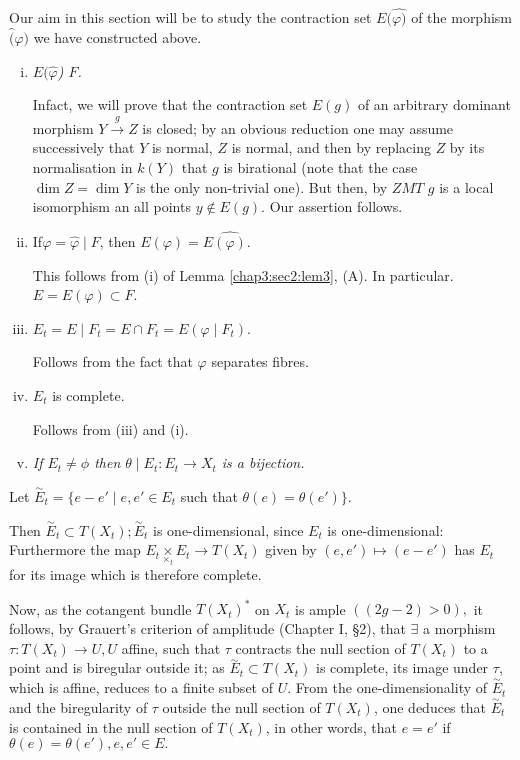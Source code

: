 Our aim in this section will be to study the contraction set $ E
(\hat{\varphi)}$ of the morphism $\hat(\varphi)$ we have
constructed above. 
\begin{enumerate}[(i)]
\item \textit{$E(\hat{\varphi}$) 
  $\hat{F}$.} 

  Infact, we will prove that the contraction set $E(g)$ of an arbitrary
  dominant morphism  $Y \overset{g}\longrightarrow Z$ is closed; by
  an obvious reduction one may assume successively that $Y$ is normal,
  $Z$ is normal, and then by replacing $Z$ by its normalisation in
  $k(Y)$ that $g$ is birational (note that the case $\dim Z= \dim Y$
  is the only non-trivial one). But then, by $ZMT$ $g$ is a local
  isomorphism an all points $ y \notin E(g)$. Our assertion follows. 
\item  If\pageoriginale $\varphi = \hat{\varphi} \mid F$, then
  $E(\varphi) = E\hat{(\varphi)}$. 
  
  This follows from (i) of Lemma \ref{chap3:sec2:lem3}, (A). In particular. $E =
  E(\varphi) \subset F$. 

\item $E_t = E \mid F_t = E \cap F_t = E(\varphi \mid F_t)$.

  Follows from the fact that $\varphi$ separates fibres.

\item $E_t$  is complete.

  Follows from (iii) and (i).
\item  \textit{If $E_t \neq \phi$  then  $\theta \mid E_t: E_t
  \longrightarrow X_t$ is a bijection.} 
\end{enumerate}

Let $ \overset{\sim}{E}_t = \bigg\{e - e' \mid e,e' \in E_t$  such
that $\theta (e) = \theta (e')\bigg\}$. 

Then $ \overset{\sim}{E}_t \subset T(X_t) ; \overset{\sim}{E}_t$ is
one-dimensional, since $ E_t$ is one-dimen\-sional: Furthermore the map
$ E_t \underset{\times_t}{\times} E_t \longrightarrow T(X_t)$ given by
$ (e,e') \longmapsto (e-e')$ has $E_t$ for its image which is
therefore complete. 

Now, as the cotangent bundle $T (X_t)^\ast$ on $ X_t$ is ample $((
2g - 2) > 0),$ it follows, by Grauert's criterion of amplitude
(Chapter I, \S 2), that $\exists$ a morphism $ \tau :T(X_t)
\rightarrow U, U$ affine, such that $\tau$ contracts the null section
of $T(X_t)$ to a point and is biregular outside it; as $
\overset{\sim}{E}_t \subset T(X_t)$ is complete, its image under
$\tau$, which is affine, reduces to a finite subset of $U$. From the
one-dimensionality of $ \overset{\sim}{E}_t$ and the biregularity of
$\tau$ outside the null section of $T (X_t)$, one deduces that $
\overset{\sim}{E}_t$ is contained in the null section of  $T (X_t)$,
in other words, that $ e = e'$ if $\theta (e) = \theta (e'), e,e' \in
E.$ 

